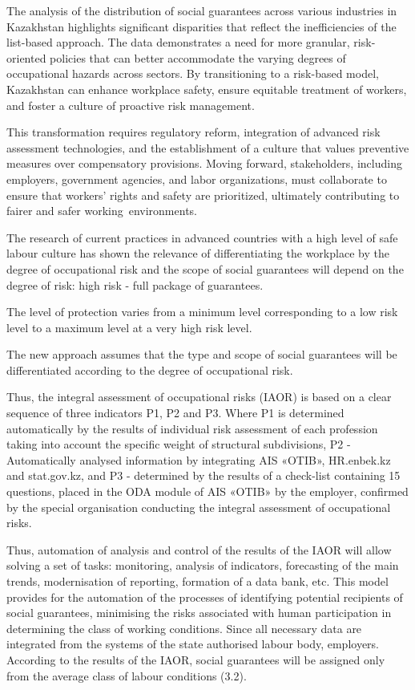 The analysis of the distribution of social guarantees across various
industries in Kazakhstan highlights significant disparities that reflect
the inefficiencies of the list-based approach. The data demonstrates a
need for more granular, risk-oriented policies that can better
accommodate the varying degrees of occupational hazards across sectors.
By transitioning to a risk-based model, Kazakhstan can enhance workplace
safety, ensure equitable treatment of workers, and foster a culture of
proactive risk management.

This transformation requires regulatory reform, integration of advanced
risk assessment technologies, and the establishment of a culture that
values preventive measures over compensatory provisions. Moving forward,
stakeholders, including employers, government agencies, and labor
organizations, must collaborate to ensure that workers'{}
rights and safety are prioritized, ultimately contributing to fairer and
safer working~environments.

The research of current practices in advanced countries with a high
level of safe labour culture has shown the relevance of differentiating
the workplace by the degree of occupational risk and the scope of social
guarantees will depend on the degree of risk: high risk - full package
of guarantees.

The level of protection varies from a minimum level corresponding to a
low risk level to a maximum level at a very high risk level.

The new approach assumes that the type and scope of social guarantees
will be differentiated according to the degree of occupational risk.

Thus, the integral assessment of occupational risks (IAOR) is based on a
clear sequence of three indicators P1, P2 and P3. Where P1 is determined
automatically by the results of individual risk assessment of each
profession taking into account the specific weight of structural
subdivisions, P2 - Automatically analysed information by integrating AIS
«OTIB», HR.enbek.kz and stat.gov.kz, and P3 - determined by the results
of a check-list containing 15 questions, placed in the ODA module of AIS
«OTIB» by the employer, confirmed by the special organisation conducting
the integral assessment of occupational risks.

Thus, automation of analysis and control of the results of the IAOR will
allow solving a set of tasks: monitoring, analysis of indicators,
forecasting of the main trends, modernisation of reporting, formation of
a data bank, etc. This model provides for the automation of the
processes of identifying potential recipients of social guarantees,
minimising the risks associated with human participation in determining
the class of working conditions. Since all necessary data are integrated
from the systems of the state authorised labour body, employers.
According to the results of the IAOR, social guarantees will be assigned
only from the average class of labour conditions (3.2).

